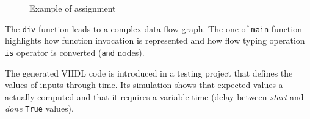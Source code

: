 \documentclass[10pt,a4paper]{article}
\newcommand{\code}{\texttt}
\newcommand{\whileyLine}{\lstinline[language=Whiley,basicstyle=\normalsize\ttfamily]}
\begin{document}
\begin{figure}[H]
\vspace{-10pt}
\centering
{}
\quad {}

\caption {Example of assignment}
\end{figure}

The \whileyLine {div} function leads to a complex data-flow graph. The one of \whileyLine {main} function highlights how function invocation is represented and how flow typing operation \whileyLine{is} operator is converted (\code {and} nodes).

The generated VHDL code is introduced in a testing project that defines the values of inputs through time. Its simulation shows that expected values a actually computed and that it requires a variable time (delay between \textit{start} and \textit{done} \code {True} values).
\end{document}
